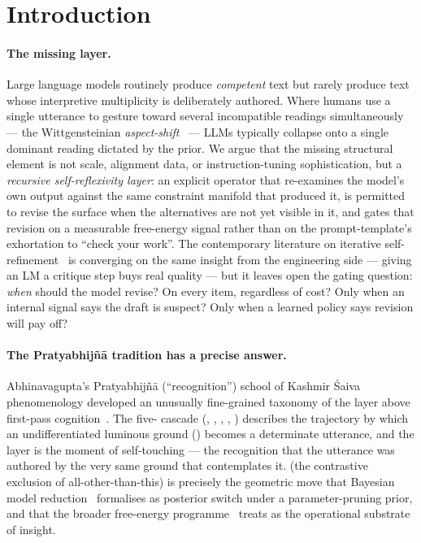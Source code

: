 \section{Introduction}\label{sec:intro}

\sloppy

\paragraph{The missing layer.} Large language models routinely produce \emph{competent} text but rarely produce text whose interpretive multiplicity is deliberately authored. Where humans use a single utterance to gesture toward several incompatible readings simultaneously --- the Wittgensteinian \emph{aspect-shift}~\citep{WittgensteinPI} --- LLMs typically collapse onto a single dominant reading dictated by the prior. We argue that the missing structural element is not scale, alignment data, or instruction-tuning sophistication, but a \emph{recursive self-reflexivity layer}: an explicit operator that re-examines the model's own output against the same constraint manifold that produced it, is permitted to revise the surface when the alternatives are not yet visible in it, and gates that revision on a measurable free-energy signal rather than on the prompt-template's exhortation to ``check your work''. The contemporary literature on iterative self-refinement~\citep{MadaanEtAl2023SelfRefineNeurIPS,ShinnEtAl2023Reflexion,BaiEtAl2022ConstitutionalAI} is converging on the same insight from the engineering side --- giving an LM a critique step buys real quality --- but it leaves open the gating question: \emph{when} should the model revise? On every item, regardless of cost? Only when an internal signal says the draft is suspect? Only when a learned policy says revision will pay off?

\paragraph{The Pratyabhij\~n\=a tradition has a precise answer.} Abhinavagupta's Pratyabhij\~n\=a (``recognition'') school of Kashmir \'Saiva phenomenology developed an unusually fine-grained taxonomy of the layer above first-pass cognition~\citep{Lawrence1996TantricArgumentPEW,abhinavagupta-isvarapratyabhijna,pratyabhijnahrdayam-singh}. The five- cascade (, , , , ) describes the trajectory by which an undifferentiated luminous ground () becomes a determinate utterance, and the  layer is the moment of self-touching --- the recognition that the utterance was authored by the very same ground that contemplates it.  (the contrastive exclusion of all-other-than-this) is precisely the geometric move that Bayesian model reduction~\citep{Friston2018BayesianModelReductionArxiv,FristonPenny2011,FristonEtAl2016BayesianModelReductionEmpiricalBayesDCM} formalises as posterior switch under a parameter-pruning prior, and that the broader free-energy programme~\citep{Friston2010FreeEnergyUnifiedBrainTheory,Friston2017ActiveInferenceCuriosity,Friston2013LifeAsWeKnowItJRSAInterface,Heins2022pymdp} treats as the operational substrate of insight.

